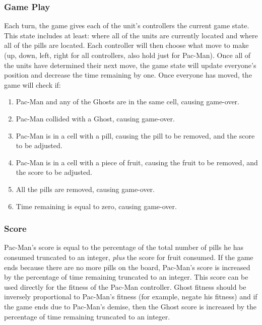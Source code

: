 \documentclass{article}
\begin{document}
\subsubsection*{Game Play}
Each turn, the game gives each of the unit's controllers the current game state. This state includes at least: where all of the units are currently located and where all of the pills are located. Each controller will then choose what move to make (up, down, left, right for all controllers, also hold just for Pac-Man). Once all of the units have determined their next move, the game state will update everyone's position and decrease the time remaining by one. Once everyone has moved, the game will check if:
\begin{enumerate}
\item Pac-Man and any of the Ghosts are in the same cell, causing game-over.
\item Pac-Man collided with a Ghost, causing game-over.
\item Pac-Man is in a cell with a pill, causing the pill to be removed, and the score to be adjusted.
\item Pac-Man is in a cell with a piece of fruit, causing the fruit to be removed, and the score to be adjusted.
\item All the pills are removed, causing game-over.
\item Time remaining is equal to zero, causing game-over.
\end{enumerate}

\subsubsection*{Score}
Pac-Man's score is equal to the percentage of the total number of pills he has consumed truncated to an integer, \emph{plus} the score for fruit consumed. If the game ends because there are no more pills on the board, Pac-Man's score is increased by the percentage of time remaining truncated to an integer. This score can be used directly for the fitness of the Pac-Man controller. Ghost fitness should be inversely proportional to Pac-Man's fitness (for example, negate his fitness) and if the game ends due to Pac-Man's demise, then the Ghost score is increased by the percentage of time remaining truncated to an integer.
\end{document}
